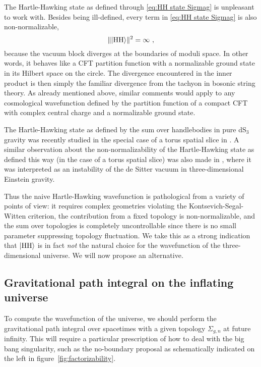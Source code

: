 \documentclass[12pt,a4paper]{article}
\newcommand{\be}{\begin{equation}}
\newcommand{\ee}{\end{equation}}
\begin{document}
The Hartle-Hawking state as defined through \eqref{eq:HH state Sigmag} is unpleasant to work with. Besides being ill-defined, every term in \eqref{eq:HH state Sigmag} is also non-normalizable,
\be 
\lVert \ket{\text{HH}} \rVert^2=\infty~,
\ee
because the vacuum block diverges at the boundaries of moduli space. In other words, it behaves like a CFT partition function with a normalizable ground state in its Hilbert space on the circle. The divergence encountered in the inner product is then simply the familiar divergence from the tachyon in bosonic string theory. 
As already mentioned above, similar comments would apply to any cosmological wavefunction defined by the partition function of a compact CFT with complex central charge and a normalizable ground state.

The Hartle-Hawking state as defined by the sum over handlebodies in pure dS$_3$ gravity was recently studied in the special case of a torus spatial slice in \cite{Godet:2024ich}. A similar observation about the non-normalizability of the Hartle-Hawking state as defined this way (in the case of a torus spatial slice) was also made in \cite{Castro:2012gc}, where it was interpreted as an instability of the de Sitter vacuum in three-dimensional Einstein gravity.

Thus the naive Hartle-Hawking wavefunction is pathological from a variety of points of view: it requires complex geometries violating the Kontsevich-Segal-Witten criterion, the contribution from a fixed topology is non-normalizable, and the sum over topologies is completely uncontrollable since there is no small parameter suppressing topology fluctuation.
We take this as a strong indication that $\ket{\text{HH}}$ is in fact \emph{not} the natural choice for the wavefunction of the three-dimensional universe. We will now propose an alternative.



\subsection{Gravitational path integral on the inflating universe}

To compute the wavefunction of the universe, we should perform the gravitational path integral over spacetimes with a given topology $\Sigma_{g,n}$ at future infinity. This will require a particular prescription of how to deal with the big bang singularity, such as the no-boundary proposal as schematically indicated on the left in figure~\ref{fig:factorizability}.
\end{document}
